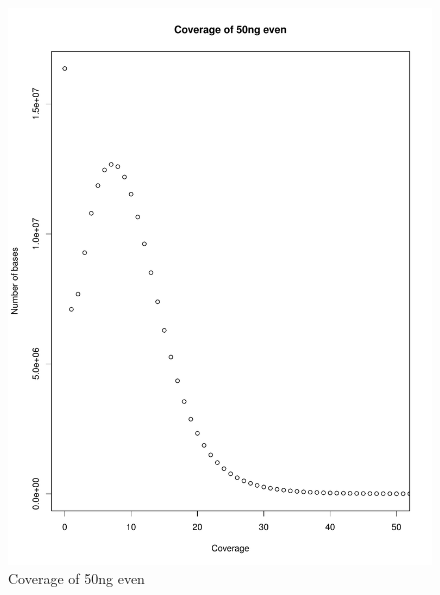 \documentclass[a4paper,12pt]{article}
\begin{document}
\begin{figure}[ht!]
  \centering
    \includegraphics[width=\textwidth]{figures/coverageperbase-50ng_even.pdf}
  \caption{Coverage of 50ng even}
  \label{fig:coverage50ngeven}
\end{figure}
\end{document}

